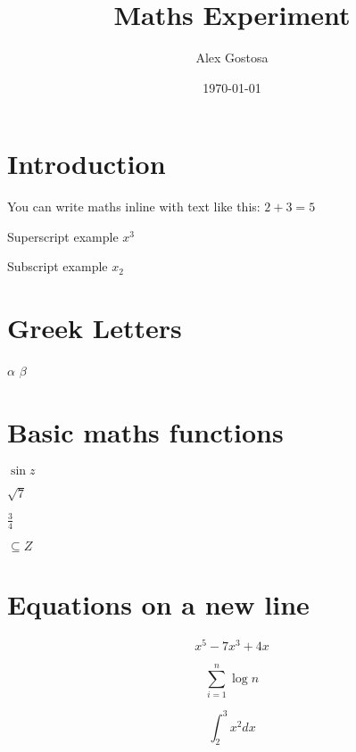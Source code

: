 \documentclass{article}
\title{Maths Experiment}
\author{Alex Gostosa}
\date{\today}
\begin{document}
\section{Introduction}
You can write maths inline with text like this: $2+3 = 5$

Superscript example $ x^3 $

Subscript example $ x_2 $


\section{Greek Letters}

$\alpha$
$\beta$


\section{Basic maths functions}

$\sin{z}$

$\sqrt{7}$

$\frac{3}{4}$

$\subseteq Z$


\section{Equations on a new line}

\begin{equation}
    x^5-7x^3+4x
\end{equation}

\begin{equation}
    \sum^{n}_{i=1}\log{n}
\end{equation}

\begin{equation*}
    \int^{3}_{2}{x^2dx}
\end{equation*}
\end{document}
